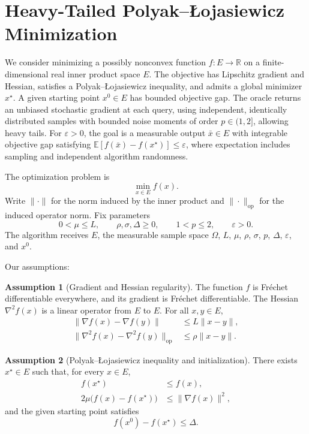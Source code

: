 \documentclass[10pt]{article}
\theoremstyle{definition}
\newtheorem{assumption}{Assumption}
\begin{document}
\section*{Heavy-Tailed Polyak--\L{}ojasiewicz Minimization}
We consider minimizing a possibly nonconvex function $f:E\to\mathbb{R}$ on a finite-dimensional real inner product space $E$. The objective has Lipschitz gradient and Hessian, satisfies a Polyak--\L{}ojasiewicz inequality, and admits a global minimizer $x^\star$. A given starting point $x^0\in E$ has bounded objective gap. The oracle returns an unbiased stochastic gradient at each query, using independent, identically distributed samples with bounded noise moments of order $p\in(1,2]$, allowing heavy tails. For $\varepsilon>0$, the goal is a measurable output $\bar{x}\in E$ with integrable objective gap satisfying $\mathbb{E}[f(\bar{x})-f(x^\star)]\leq\varepsilon$, where expectation includes sampling and independent algorithm randomness.

The optimization problem is
\[
\min_{x\in E} f(x).
\]
Write $\|\cdot\|$ for the norm induced by the inner product and $\|\cdot\|_{\mathrm{op}}$ for the induced operator norm. Fix parameters
\[
0<\mu\leq L,\qquad \rho,\sigma,\Delta\geq0,
\qquad 1<p\leq2,\qquad \varepsilon>0.
\]
The algorithm receives $E$, the measurable sample space $\Omega$, $L$, $\mu$, $\rho$, $\sigma$, $p$, $\Delta$, $\varepsilon$, and $x^0$.

Our assumptions:
\begin{assumption}[Gradient and Hessian regularity]
The function $f$ is Fr\'echet differentiable everywhere, and its gradient is Fr\'echet differentiable. The Hessian $\nabla^2 f(x)$ is a linear operator from $E$ to $E$. For all $x,y\in E$,
\[
\begin{aligned}
\|\nabla f(x)-\nabla f(y)\|&\leq L\|x-y\|,\\
\|\nabla^2 f(x)-\nabla^2 f(y)\|_{\mathrm{op}}&\leq\rho\|x-y\|.
\end{aligned}
\]
\end{assumption}

\begin{assumption}[Polyak--\L{}ojasiewicz inequality and initialization]
There exists $x^\star\in E$ such that, for every $x\in E$,
\[
\begin{aligned}
f(x^\star)&\leq f(x),\\
2\mu\bigl(f(x)-f(x^\star)\bigr)&\leq\|\nabla f(x)\|^2,
\end{aligned}
\]
and the given starting point satisfies
\[
f(x^0)-f(x^\star)\leq\Delta.
\]
\end{assumption}
\end{document}
